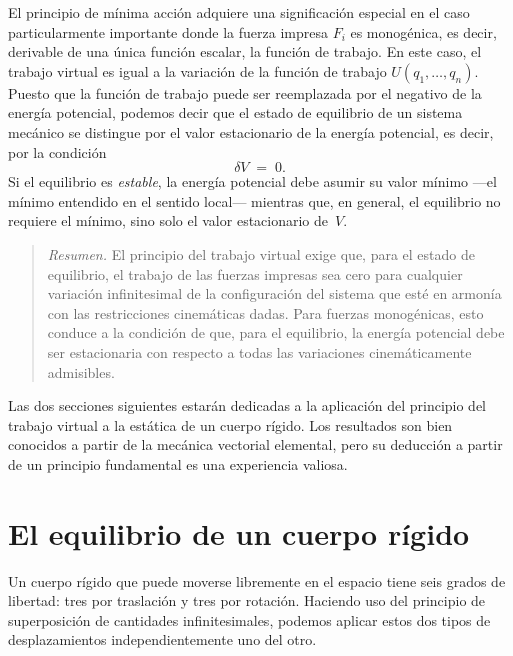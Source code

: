 El principio de mínima acción adquiere una significación especial en el caso particularmente importante donde la fuerza impresa $F_i$ es monogénica, es decir, derivable de una única función escalar, la función de trabajo. En este caso, el trabajo virtual es igual a la variación de la función de trabajo $U(q_1, \ldots, q_n)$. Puesto que la función de trabajo puede ser reemplazada por el negativo de la energía potencial, podemos decir que el estado de equilibrio de un sistema mecánico se distingue por el valor estacionario de la energía potencial, es decir, por la condición
\begin{equation}
\delta V \;=\; 0. \tag{31.5}
\end{equation}
Si el equilibrio es \emph{estable}, la energía potencial debe asumir su valor mínimo ---el mínimo entendido en el sentido local--- mientras que, en general, el equilibrio no requiere el mínimo, sino solo el valor estacionario de~$V$.

\begin{quote}
\textit{Resumen.} El principio del trabajo virtual exige que, para el estado de equilibrio, el trabajo de las fuerzas impresas sea cero para cualquier variación infinitesimal de la configuración del sistema que esté en armonía con las restricciones cinemáticas dadas. Para fuerzas monogénicas, esto conduce a la condición de que, para el equilibrio, la energía potencial debe ser estacionaria con respecto a todas las variaciones cinemáticamente admisibles.
\end{quote}

Las dos secciones siguientes estarán dedicadas a la aplicación del principio del trabajo virtual a la estática de un cuerpo rígido. Los resultados son bien conocidos a partir de la mecánica vectorial elemental, pero su deducción a partir de un principio fundamental es una experiencia valiosa.

\section{El equilibrio de un cuerpo rígido}

Un cuerpo rígido que puede moverse libremente en el espacio tiene seis grados de libertad: tres por traslación y tres por rotación. Haciendo uso del principio de superposición de cantidades infinitesimales, podemos aplicar estos dos tipos de desplazamientos independientemente uno del otro.

